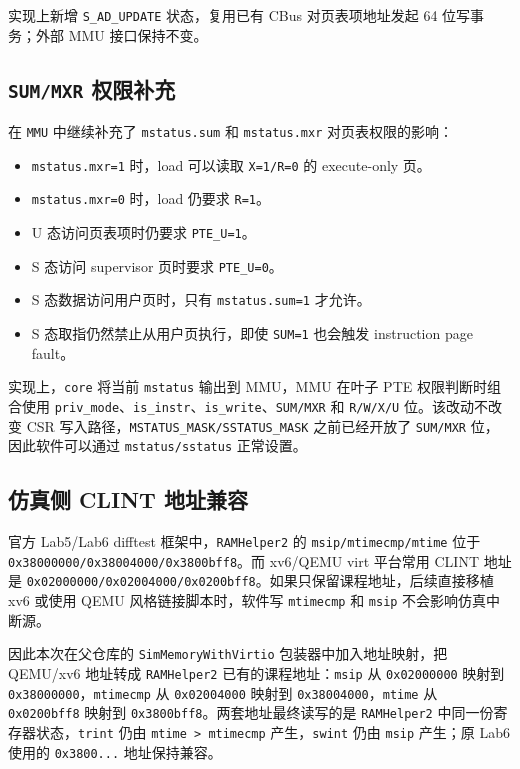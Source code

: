 \documentclass[UTF8,a4paper,11pt]{ctexart}
\begin{document}
实现上新增 \texttt{S\_AD\_UPDATE} 状态，复用已有 CBus 对页表项地址发起 64 位写事务；外部 MMU 接口保持不变。

\subsection{\texttt{SUM/MXR} 权限补充}

在 \texttt{MMU} 中继续补充了 \texttt{mstatus.sum} 和 \texttt{mstatus.mxr} 对页表权限的影响：

\begin{itemize}
  \item \texttt{mstatus.mxr=1} 时，load 可以读取 \texttt{X=1/R=0} 的 execute-only 页。
  \item \texttt{mstatus.mxr=0} 时，load 仍要求 \texttt{R=1}。
  \item U 态访问页表项时仍要求 \texttt{PTE\_U=1}。
  \item S 态访问 supervisor 页时要求 \texttt{PTE\_U=0}。
  \item S 态数据访问用户页时，只有 \texttt{mstatus.sum=1} 才允许。
  \item S 态取指仍然禁止从用户页执行，即使 \texttt{SUM=1} 也会触发 instruction page fault。
\end{itemize}

实现上，\texttt{core} 将当前 \texttt{mstatus} 输出到 MMU，MMU 在叶子 PTE 权限判断时组合使用 \texttt{priv\_mode}、\texttt{is\_instr}、\texttt{is\_write}、\texttt{SUM/MXR} 和 \texttt{R/W/X/U} 位。该改动不改变 CSR 写入路径，\texttt{MSTATUS\_MASK/SSTATUS\_MASK} 之前已经开放了 \texttt{SUM/MXR} 位，因此软件可以通过 \texttt{mstatus/sstatus} 正常设置。

\subsection{仿真侧 CLINT 地址兼容}

官方 Lab5/Lab6 difftest 框架中，\texttt{RAMHelper2} 的 \texttt{msip/mtimecmp/mtime} 位于 \texttt{0x38000000/0x38004000/0x3800bff8}。而 xv6/QEMU virt 平台常用 CLINT 地址是 \texttt{0x02000000/0x02004000/0x0200bff8}。如果只保留课程地址，后续直接移植 xv6 或使用 QEMU 风格链接脚本时，软件写 \texttt{mtimecmp} 和 \texttt{msip} 不会影响仿真中断源。

因此本次在父仓库的 \texttt{SimMemoryWithVirtio} 包装器中加入地址映射，把 QEMU/xv6 地址转成 \texttt{RAMHelper2} 已有的课程地址：\texttt{msip} 从 \texttt{0x02000000} 映射到 \texttt{0x38000000}，\texttt{mtimecmp} 从 \texttt{0x02004000} 映射到 \texttt{0x38004000}，\texttt{mtime} 从 \texttt{0x0200bff8} 映射到 \texttt{0x3800bff8}。两套地址最终读写的是 \texttt{RAMHelper2} 中同一份寄存器状态，\texttt{trint} 仍由 \texttt{mtime > mtimecmp} 产生，\texttt{swint} 仍由 \texttt{msip} 产生；原 Lab6 使用的 \texttt{0x3800...} 地址保持兼容。
\end{document}
